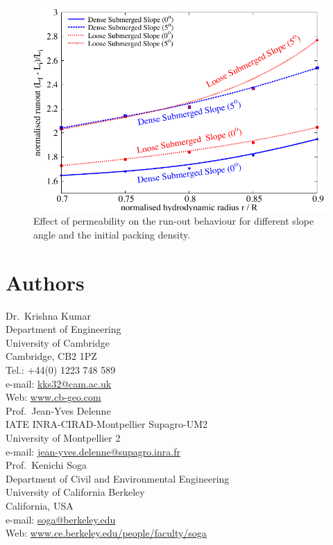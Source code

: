 \documentclass[12pt,twoside]{tuhhproc-en}
\begin{document}
\begin{figure}
\centering
\includegraphics[width=0.97\columnwidth]{figs/Perm_Runout_slope}
\caption{Effect of permeability on the run-out behaviour for different slope 
angle and the initial packing density.}
\label{fig:Perm_Runout_slope}
\end{figure}


{\renewcommand{\markboth}[2]{}%
  \printbibliography}

\section*{Authors}\small
Dr.\ Krishna Kumar\\
Department of Engineering \\
University of Cambridge \\
Cambridge, CB2 1PZ\\
Tel.: +44(0) 1223 748 589\\
e-mail: \url{kks32@cam.ac.uk}\\
Web: \url{www.cb-geo.com}\\

Prof.\ Jean-Yves Delenne\\
IATE INRA-CIRAD-Montpellier Supagro-UM2\\
University of Montpellier 2 \\
e-mail: \url{jean-yves.delenne@supagro.inra.fr}\\

Prof.\ Kenichi Soga\\
Department of Civil and Environmental Engineering \\
University of California Berkeley \\
California, USA\\
e-mail: \url{soga@berkeley.edu}\\
Web: \url{www.ce.berkeley.edu/people/faculty/soga}\\
\end{document}
